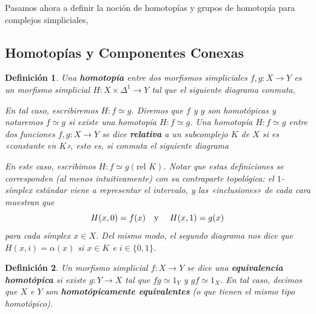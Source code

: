 \documentclass[11pt]{report}
\theoremstyle{colored}
\newtheorem{definition}{Definición}[section]
\renewcommand{\ss}[1]{\Delta^{#1}}
\newcommand{\guill}[1]{«#1»}
\begin{document}
Pasamos ahora a definir la noción de homotopías y grupos de homotopía para complejos simpliciales,

\subsection{Homotopías y Componentes Conexas}

\begin{definition} Una \textbf{homotopía} entre dos morfismos simpliciales $f,g : X \to Y$ es un morfismo simplicial $H : X \times \ss{1} \to Y$ tal que el siguiente diagrama conmuta,
\begin{center}
\end{center}
En tal caso, escribiremos $H : f \simeq g$. Diremos que $f$ y $g$ son homotópicas y notaremos $f \simeq g$ si existe una homotopía $H: f \simeq g$. Una homotopía $H : f \simeq g$ entre dos funciones $f,g : X \to Y$ se dice \textbf{relativa} a un subcomplejo $K$ de $X$ si es \guill{constante en $K$}, esto es, si conmuta el siguiente diagrama
\begin{center}
\end{center}
En este caso, escribimos $H : f \simeq g (\text{rel $K$})$. Notar que estas definiciones se corresponden (al menos intuitivamente) con su contraparte topológica: el $1$-símplex estándar viene a representar el intervalo, y las \guill{inclusiones} de cada cara muestran que 
\[
H(x,0) = f(x) \text{\quad y \quad} H(x,1) = g(x)
\]
para cada símplex $x \in X$. Del mismo modo, el segundo diagrama nos dice que $H(x,i) = \alpha(x)$ si $x \in K$ e $i \in \{0,1\}$. 
\end{definition}

\begin{definition} Un morfismo simplicial $f : X \to Y$ se dice una \textbf{equivalencia homotópica} si existe $g : Y \to X$ tal que $fg \simeq 1_Y$ y $gf \simeq 1_X$. En tal caso, decimos que $X$ e $Y$ son \textbf{homotópicamente equivalentes} (o que tienen el mismo tipo homotópico).
\end{definition}
\end{document}
